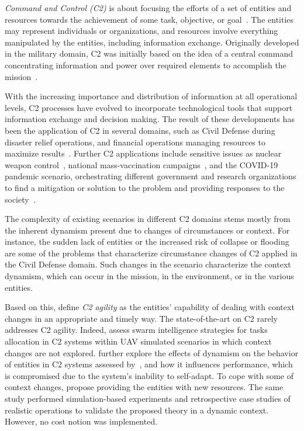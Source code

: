 \textit{Command and Control (C2)} is about focusing the efforts of a set of entities and resources towards the achievement of some task, objective, or goal~\citep{Alberts2006}. The entities may represent individuals or organizations, and resources involve everything manipulated by the entities, including information exchange. Originally developed in the military domain, C2 was initially based on the idea of a central command concentrating information and power over required elements to accomplish the mission~\citep{Power01}.

With the increasing importance and distribution of information at all operational levels, C2 processes have evolved to incorporate technological tools that support  information exchange and decision making. The result of these developments has been the application of C2 in several domains, such as Civil Defense during disaster relief operations, and financial operations managing resources to maximize results~\citep{CC03,Fernandes2016}. Further C2 applications include sensitive issues as nuclear weapon control~\citep{C2-EX2}, national mass-vaccination campaigns~\citep{C2-EX1}, and the COVID-19 pandemic scenario, orchestrating different government and research organizations to find a mitigation or solution to the problem and providing responses to the society~\citep{C2-EX5, C2-EX3, C2-EX4}.

The complexity of existing scenarios in different C2 domains stems mostly from the inherent dynamism \color{black}present due to  \color{black}changes of circumstances or context. For instance, the sudden lack of entities or the increased risk of collapse or flooding are some of the problems that characterize circumstance changes of C2 applied in the Civil Defense domain. Such changes in the scenario characterize the context dynamism, which can occur in the mission, in the environment, or in the various entities.


Based on this, \citet{FRANCE2014} define \emph{C2 agility} as the entities’ capability of dealing with context changes in an appropriate and timely way. The state-of-the-art on C2 rarely addresses C2 agility. Indeed, 
\citet{MAS07} assess swarm intelligence strategies for tasks allocation in C2 systems within UAV simulated scenarios in which context changes are not explored. \citet{UAV01} further explore the effects of dynamism on the behavior of  entities in C2 systems assessed by~\citet{MAS07}, and how it influences performance, which is compromised due to the system’s inability to self-adapt. To cope with some of context changes, \citet{FRANCE2014} propose providing the entities with new resources. The same study performed simulation-based experiments and retrospective case studies of realistic operations to validate the proposed theory in a dynamic context. However, no cost notion was implemented. 

